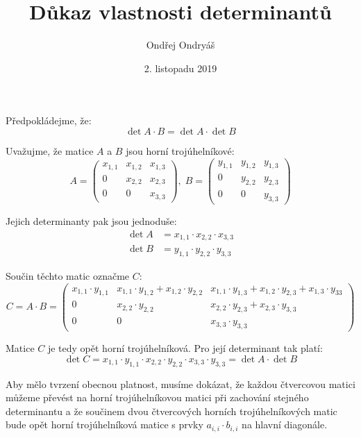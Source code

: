 \documentclass[12pt,a4paper]{article}
\author{Ondřej Ondryáš}
\title{Důkaz vlastnosti determinantů}
\date{2. listopadu 2019}
\begin{document}
\maketitle

Předpokládejme, že:
\[ \det{A \cdot B} = \det{A} \cdot \det{B} \]

Uvažujme, že matice $A$ a $B$ jsou horní trojúhelníkové:
\[
 A = \begin{pmatrix}
  x_{1,1} & x_{1,2} & x_{1,3} \\
  0 & x_{2,2} & x_{2,3} \\
  0 & 0 & x_{3,3}
 \end{pmatrix},\;
 B = \begin{pmatrix}
  y_{1,1} & y_{1,2} & y_{1,3} \\
  0 & y_{2,2} & y_{2,3} \\
  0 & 0 & y_{3,3}
 \end{pmatrix}
\]

Jejich determinanty pak jsou jednoduše:
\begin{align*}
	\det{A} & = x_{1,1} \cdot x_{2,2} \cdot x_{3,3} \\
	\det{B} & = y_{1,1} \cdot y_{2,2} \cdot y_{3,3}
\end{align*}

Součin těchto matic označme $C$:
\[
 C = A \cdot B = \begin{pmatrix}
 	x_{1,1}\cdot y_{1,1} & x_{1,1}\cdot y_{1,2} + x_{1,2}\cdot y_{2,2} & x_{1,1}\cdot y_{1,3} + x_{1,2}\cdot y_{2,3} + x_{1,3}\cdot y_{33} \\
 	0 & x_{2,2}\cdot y_{2,2} & x_{2,2}\cdot y_{2,3} +x_{2,3}\cdot y_{3,3} \\
 	0 & 0 & x_{3,3}\cdot y_{3,3}
 \end{pmatrix}
\]

Matice $C$ je tedy opět horní trojúhelníková. Pro její determinant tak platí:
\[
 \det{C} = x_{1,1}\cdot y_{1,1}\cdot x_{2,2}\cdot y_{2,2}\cdot x_{3,3}\cdot y_{3,3} = \det{A}\cdot \det{B}
\]

Aby mělo tvrzení obecnou platnost, musíme dokázat, že každou čtvercovou matici můžeme převést na horní trojúhelníkovou matici při zachování stejného determinantu a že součinem dvou čtvercových horních trojúhelníkových matic bude opět horní trojúhelníková matice s prvky $a_{i,i}\cdot b_{i,i}$ na hlavní diagonále.
\end{document}
